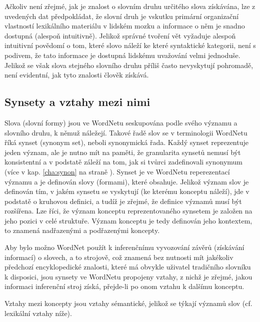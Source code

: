 \documentclass[a4paper, 11pt, oneside]{book}
\begin{document}
				Ačkoliv není zřejmé, jak je znalost o slovním druhu určitého slova získávána, lze z uvedených dat předpokládat, že slovní druh je vskutku primární organizační vlastností lexikálního materiálu v lidském mozku a informace o něm je snadno dostupná (alespoň intuitivně). Jelikož správné tvoření vět vyžaduje alespoň intuitivní povědomí o tom, které slovo náleží ke které syntaktické kategorii, není s podivem, že tato informace je dostupná lidskému uvažování velmi jednoduše. Jelikož se však slova stejného slovního druhu příliš často nevyskytují pohromadě, není evidentní, jak tyto znalosti člověk získává. \parencite{fillenbaum1965grammatical, miller1990introduction}

				\subsection{Synsety a vztahy mezi nimi}
				\label{cha:princeton-synset-rels}


					Slova (slovní formy) jsou ve WordNetu seskupována podle svého významu a slovního druhu, k němuž náležejí. Takové řadě slov se v terminologii WordNetu říká synset (synonym set), neboli synonymická řada. Každý synset reprezentuje jeden význam, ale je nutno mít na paměti, že granularita synsetů nemusí být konsistentní a v podstatě záleží na tom, jak si tvůrci zadefinovali synonymum (více v kap. \ref{cha:synon} na straně \pageref{cha:synon}). Synset je ve WordNetu reperezentací významu a je definován slovy (formami), které obsahuje. Jelikož význam slov je definován tím, v jakém synsetu se vyskytují (ke kterému konceptu náleží), jde v podstatě o kruhovou definici, a tudíž je zřejmé, že definice významů musí být rozšířena. Lze říci, že význam konceptu reprezentovaného synsetem je založen na jeho pozici v celé struktuře. Význam konceptu je tedy definován jeho kontextem, to znamená nadřazenými a podřazenými koncepty. \parencite{kamps2002visualizing}

					Aby bylo možno WordNet použít k inferenčnímu vyvozování závěrů (získávání informací) o slovech, a to strojově, což znamená bez nutnosti mít jakékoliv předchozí encyklopedické znalosti, které má obvykle uživatel tradičního slovníku k disposici, jsou synsety ve WordNetu propojeny vztahy, z nichž je zřejmé, jakou informaci inferenční stroj získá, přejde-li po onom vztahu k dalšímu konceptu. 

					Vztahy mezi koncepty jsou vztahy sémantické, jelikož se týkají významů slov (cf. lexikální vztahy níže). 
\end{document}
